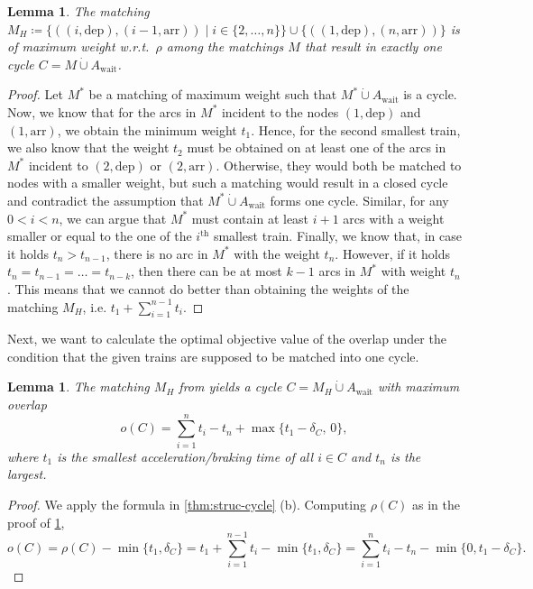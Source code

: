 \documentclass[11pt,a4paper]{article}
\newcommand{\dotcup}{\mathbin{\dot\cup}}
\newcommand{\arr}{\mathrm{arr}}
\newcommand{\dep}{\mathrm{dep}}
\newcommand{\wait}{\mathrm{wait}}
\newcommand{\energyact}{M}               %
\newcommand{\w}{\rho} %
\newtheorem{lemma}[theorem]{Lemma}
\theoremstyle{definition}
\theoremstyle{remark}
\begin{document}
\begin{lemma}\label{lem:t-matching}
	The matching $\energyact_H \coloneqq \{ ((i, \dep),(i-1, \arr)) \mid i \in \{2, \dots , n \} \} \cup \{((1, \dep),(n, \arr)) \}$ is of maximum weight w.r.t.\ $\w$ among the matchings $\energyact$ that result in exactly one cycle $C = \energyact\dotcup A_{\wait}$.
\end{lemma}

\begin{proof}
Let $\energyact^{*}$ be a matching of maximum weight such that $\energyact^{*} \dotcup A_{\wait}$ is a cycle. Now, we know that for the arcs in $\energyact^{*}$ incident to the nodes $(1, \dep)$ and $(1, \arr)$, we obtain the minimum weight $t_1$. Hence, for the second smallest train, we also know that the weight $t_2$ must be obtained on at least one of the arcs in $\energyact^{*}$ incident to $(2, \dep)$ or $(2, \arr)$. Otherwise, they would both be matched to nodes with a smaller weight, but such a matching would result in a closed cycle and contradict the assumption that $\energyact^{*} \dotcup A_{\wait}$ forms one cycle. Similar, for any $0 < i < n$, we can argue that $\energyact^{*}$ must contain at least $i+1$ arcs with a weight smaller or equal to the one of the $i^{\text{th}}$ smallest train. Finally, we know that, in case it holds $t_{n} > t_{n-1}$, there is no arc in $\energyact^{*}$ with the weight $t_n$. However, if it holds $t_{n} = t_{n-1} = \dots = t_{n-k}$, then there can be at most $k-1$ arcs in $\energyact^{*}$ with weight $t_n$.
This means that we cannot do better than obtaining the weights of the matching $\energyact_H$, i.e. $t_1 + \sum_{i=1}^{n-1} t_{i}$.
\end{proof}

Next, we want to calculate the optimal objective value of the overlap under the condition that the given trains are supposed to be matched into one cycle.

\begin{lemma}
\label{lem:t-matching-overlap}
	The matching $\energyact_H$ from  yields a cycle $C = \energyact_H \dotcup A_{\wait}$ with maximum overlap 
	  \[o(C) = \sum_{i =1}^{n} t_i - t_{n} + \max\{t_{1} - \delta_{C},\, 0 \},\]
	where $t_1$ is the smallest acceleration/braking time of all $i \in C$ and $t_n$ is the largest.      
\end{lemma}

\begin{proof}
We apply the formula in \cref{thm:struc-cycle} (b). Computing $\w(C)$ as in the proof of \cref{lem:t-matching},
\[ o(C) = \w(C)  - \min\{t_1, \delta_C\} = t_1 + \sum_{i=1}^{n-1} t_{i} - \min\{t_1, \delta_C\} = \sum_{i=1}^n t_i - t_n - \min\{0, t_1 - \delta_C\}.\]
\end{proof}
\end{document}
